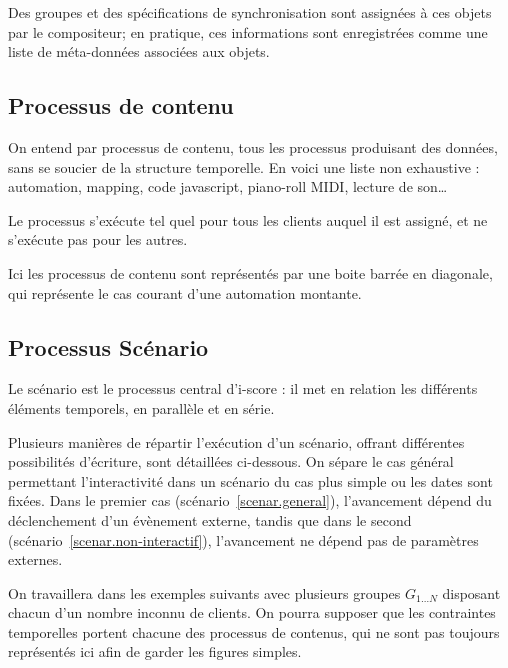 \documentclass{article}
\begin{document}
Des groupes et des spécifications de synchronisation sont assignées à ces objets par le compositeur; en pratique, ces informations sont enregistrées comme une liste de méta-données associées aux objets.


\subsection{Processus de contenu}
On entend par processus de contenu, tous les processus produisant des données, sans se soucier de la structure temporelle. 
En voici une liste non exhaustive : automation, mapping, code javascript, piano-roll MIDI, lecture de son\dots

Le processus s'exécute tel quel pour tous les clients auquel il est assigné, 
et ne s'exécute pas pour les autres.

Ici les processus de contenu sont représentés par une boite barrée en diagonale, qui représente le cas courant d'une automation montante.

\subsection{Processus Scénario}
Le scénario est le processus central d'i-score : il met en relation les différents éléments temporels, en parallèle et en série.

Plusieurs manières de répartir l'exécution d'un scénario, offrant différentes possibilités d'écriture, sont détaillées ci-dessous. 
On sépare le cas général permettant l'interactivité dans un scénario du cas plus simple ou les dates sont fixées.
Dans le premier cas (scénario~\ref{scenar.general}), l'avancement dépend du déclenchement d'un évènement externe, tandis que dans le second (scénario~\ref{scenar.non-interactif}), l'avancement ne dépend pas de paramètres externes. 

On travaillera dans les exemples suivants avec plusieurs groupes $G_{1\dots N}$ disposant chacun d'un nombre inconnu de clients. 
On pourra supposer que les contraintes temporelles portent chacune des processus de contenus, qui ne sont pas toujours représentés ici afin de garder les figures simples.
\end{document}
